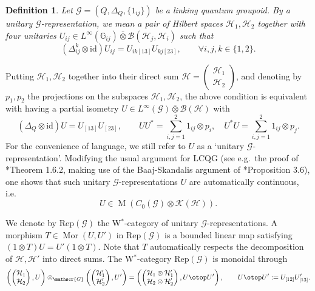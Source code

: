 \documentclass[reqno]{amsart}
\numberwithin{equation}{section}
\newtheorem{Def}[Theorem]{Definition}
\newcommand{\mcK}{\mathcal{K}}
\newcommand{\mcB}{\mathcal{B}}
\newcommand{\id}{\mathrm{id}}
\newcommand{\Hsp}{\mathcal{H}}
\newcommand{\G}{\mathbb{G}}
\newcommand{\msG}{\mathscr{G}}
\newcommand{\Rep}{\mathrm{Rep}}
\newcommand{\oon}{\operatorname}
\newcommand{\Mult}{\operatorname{M}}
\newcommand{\TensRep}{\otop}
\begin{document}
\begin{Def}\label{def1}
Let $\msG = (Q,\Delta_Q,\{1_{ij}\})$ be a linking quantum groupoid. By a \emph{unitary $\msG$-representation}, we mean a pair of Hilbert spaces $\Hsp_1,\Hsp_2$ together with four unitaries $U_{ij} \in L^{\infty}(\G_{ij})\bar\otimes \mcB(\Hsp_j,\Hsp_i)$
such that 
\[ 
(\Delta_{ij}^k \otimes \id)U_{ij} = U_{ik[13]}U_{kj[23]},\qquad \forall i,j,k\in \{1,2\}.
\]
\end{Def} 
Putting $\Hsp_1,\Hsp_2$ together into their direct sum $\Hsp = \begin{pmatrix}\Hsp_1\\ \Hsp_2\end{pmatrix}$, and denoting by $p_1,p_2$ the projections on the subspaces $\Hsp_1,\Hsp_2$, the above condition is equivalent with having a partial isometry $U \in L^{\infty}(\msG)\bar{\otimes} \mcB(\Hsp)$ with
\[
(\Delta_Q\otimes \id)U = U_{[13]}U_{[23]},\qquad UU^* = \sum_{i,j=1}^{2} 1_{ij}\otimes p_i,\quad U^*U = \sum_{i,j=1}^{2} 1_{ij}\otimes p_j. 
\]
For the convenience of language, we still refer to $U$ as a `unitary $\msG$-representation'. Modifying the usual argument for LCQG (see e.g.\ the proof of \cite{Wor96}*{Theorem 1.6.2}, making use of the Baaj-Skandalis argument of \cite{BS93}*{Proposition 3.6}),
 one shows that such unitary $\msG$-representations $U$ are automatically continuous, i.e.\
\[
U \in \Mult(C_0(\msG) \otimes \mcK(\Hsp)).
\]

We denote by $\Rep(\msG)$ the W$^*$-category of unitary $\msG$-representations. A morphism $T\in \oon{Mor}(U,U')$ in $\Rep(\msG)$ is a bounded linear map satisfying $(1\otimes T)U=U'(1\otimes T)$. Note that $T$ automatically respects the decomposition of $\Hsp,\Hsp'$ into direct sums. The W$^*$-category $\Rep(\msG)$ is monoidal through 
\begin{equation}\label{eq5}
\left(\begin{pmatrix} \Hsp_1 \\ \Hsp_2\end{pmatrix},U\right)\otimes_{\msG}  \left(\begin{pmatrix} \Hsp_1' \\ \Hsp_2'\end{pmatrix},U'\right) = \left(\begin{pmatrix} \Hsp_1 \otimes \Hsp_1' \\ \Hsp_2\otimes \Hsp_2'\end{pmatrix},U \TensRep U'\right), \qquad U \TensRep U' := U_{[12]}U_{[13]}'. 
\end{equation}
\end{document}
